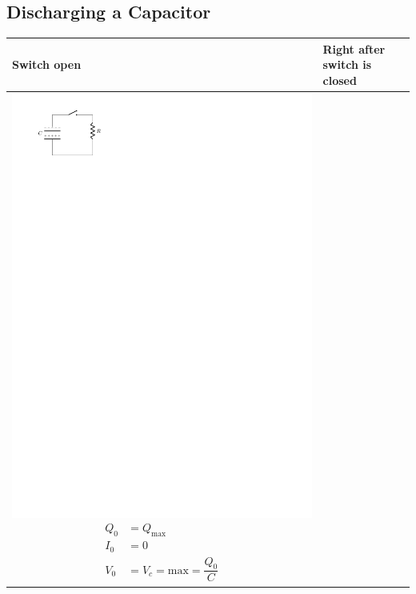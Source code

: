 \documentclass{article}
\begin{document}
    \subsection{Discharging a Capacitor}
    \begin{tabularx}{\textwidth}{ X | X }
      \textbf{Switch open} & \textbf{Right after switch is closed}\\ \hline
      \includegraphics{figures/capacitor-discharge-open.pdf}
      {\begin{align*}
        Q_0 &=Q_{\mathrm{max}}\\
        I_0 &=0\\
        V_0 &=V_c=\text{max}=\dfrac{Q_0}{C}
      \end{align*}}
      &

\end{tabularx}
\end{document}
